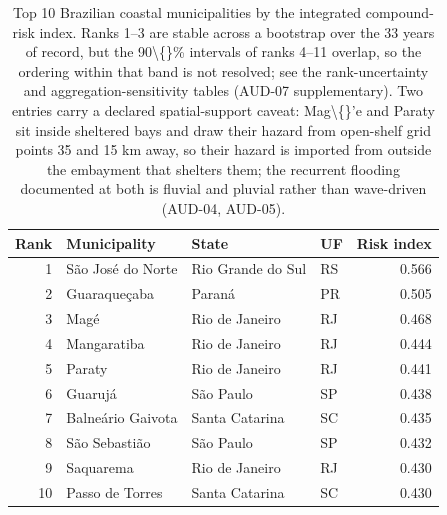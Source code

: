 \begin{table}[htbp]
\caption{Top 10 Brazilian coastal municipalities by the integrated compound-risk index. Ranks 1--3 are stable across a bootstrap over the 33 years of record, but the 90\textbackslash\{\}\% intervals of ranks 4--11 overlap, so the ordering within that band is not resolved; see the rank-uncertainty and aggregation-sensitivity tables (AUD-07 supplementary). Two entries carry a declared spatial-support caveat: Mag\textbackslash\{\}'e and Paraty sit inside sheltered bays and draw their hazard from open-shelf grid points 35 and 15 km away, so their hazard is imported from outside the embayment that shelters them; the recurrent flooding documented at both is fluvial and pluvial rather than wave-driven (AUD-04, AUD-05).}
\label{tab:top10-municipal-integrated-risk}
\begin{tabular}{rlllr}
\toprule
Rank & Municipality & State & UF & Risk index \\
\midrule
1 & São José do Norte & Rio Grande do Sul & RS & 0.566 \\
2 & Guaraqueçaba & Paraná & PR & 0.505 \\
3 & Magé & Rio de Janeiro & RJ & 0.468 \\
4 & Mangaratiba & Rio de Janeiro & RJ & 0.444 \\
5 & Paraty & Rio de Janeiro & RJ & 0.441 \\
6 & Guarujá & São Paulo & SP & 0.438 \\
7 & Balneário Gaivota & Santa Catarina & SC & 0.435 \\
8 & São Sebastião & São Paulo & SP & 0.432 \\
9 & Saquarema & Rio de Janeiro & RJ & 0.430 \\
10 & Passo de Torres & Santa Catarina & SC & 0.430 \\
\bottomrule
\end{tabular}
\end{table}
